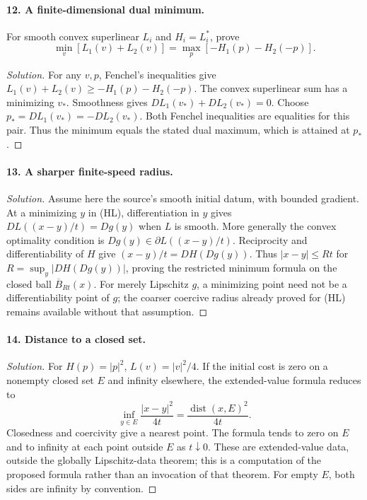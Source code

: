 \Needspace{30mm}
\paragraph{12. A finite-dimensional dual minimum.}
For smooth convex superlinear $L_i$ and $H_i=L_i^*$, prove
\[
 \min_v[L_1(v)+L_2(v)]=\max_p[-H_1(p)-H_2(-p)].
\]
\begin{proof}[Solution]
For any $v,p$, Fenchel's inequalities give
$L_1(v)+L_2(v)\geq-H_1(p)-H_2(-p)$.
The convex superlinear sum has a minimizing $v_*$.
Smoothness gives $DL_1(v_*)+DL_2(v_*)=0$.
Choose $p_*=DL_1(v_*)=-DL_2(v_*)$.
Both Fenchel inequalities are equalities for this pair.
Thus the minimum equals the stated dual maximum, which is attained at $p_*$.
\end{proof}

\Needspace{30mm}
\paragraph{13. A sharper finite-speed radius.}
\begin{proof}[Solution]
Assume here the source's smooth initial datum, with bounded gradient.
At a minimizing $y$ in (HL), differentiation in $y$ gives
$DL((x-y)/t)=Dg(y)$ when $L$ is smooth.
More generally the convex optimality condition is
$Dg(y)\in\partial L((x-y)/t)$.
Reciprocity and differentiability of $H$ give
$(x-y)/t=DH(Dg(y))$.
Thus $|x-y|\leq Rt$ for $R=\sup_y|DH(Dg(y))|$, proving the restricted
minimum formula on the closed ball $\overline B_{Rt}(x)$.
For merely Lipschitz $g$, a minimizing point need not be a differentiability
point of $g$; the coarser coercive radius already proved for (HL)
remains available without that assumption.
\end{proof}

\Needspace{30mm}
\Needspace{45mm}
\paragraph{14. Distance to a closed set.}
\begin{proof}[Solution]
For $H(p)=|p|^2$, $L(v)=|v|^2/4$.
If the initial cost is zero on a nonempty closed set $E$ and infinity
elsewhere, the extended-value formula reduces to
\[
 \inf_{y\in E}\frac{|x-y|^2}{4t}
              =\frac{\operatorname{dist}(x,E)^2}{4t}.
\]
Closedness and coercivity give a nearest point.
The formula tends to zero on $E$ and to infinity at each point outside
$E$ as $t\downarrow0$. These are extended-value data, outside the
globally Lipschitz-data theorem; this is a computation of the proposed
formula rather than an invocation of that theorem.
For empty $E$, both sides are infinity by convention.
\end{proof}

